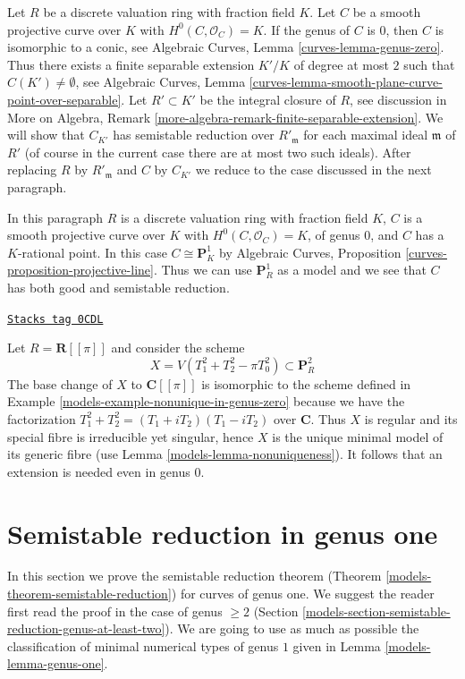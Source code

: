 \medskip\noindent
Let $R$ be a discrete valuation ring with fraction field $K$.
Let $C$ be a smooth projective curve over $K$ with $H^0(C, \mathcal{O}_C) = K$.
If the genus of $C$ is $0$, then $C$ is isomorphic to a conic,
see Algebraic Curves, Lemma \ref{curves-lemma-genus-zero}.
Thus there exists a finite separable extension $K'/K$ of
degree at most $2$ such that $C(K') \not = \emptyset$, see
Algebraic Curves, Lemma
\ref{curves-lemma-smooth-plane-curve-point-over-separable}.
Let $R' \subset K'$ be the integral closure of $R$, see
discussion in More on Algebra, Remark
\ref{more-algebra-remark-finite-separable-extension}.
We will show that $C_{K'}$ has semistable reduction
over $R'_{\mathfrak m}$ for each maximal ideal $\mathfrak m$ of $R'$
(of course in the current case there are at most two such ideals).
After replacing $R$ by $R'_{\mathfrak m}$ and $C$ by $C_{K'}$
we reduce to the case discussed in the next paragraph.

\medskip\noindent
In this paragraph $R$ is a discrete valuation ring with fraction field $K$,
$C$ is a smooth projective curve over $K$ with $H^0(C, \mathcal{O}_C) = K$,
of genus $0$, and $C$ has a $K$-rational point. In this case
$C \cong \mathbf{P}^1_K$ by
Algebraic Curves, Proposition \ref{curves-proposition-projective-line}.
Thus we can use $\mathbf{P}^1_R$ as a model and we see that
$C$ has both good and semistable reduction.

\begin{example}
\label{models-example-extension-necessary-genus-zero}
\href{https://stacks.math.columbia.edu/tag/0CDL}{\texttt{Stacks tag 0CDL}}

Let $R = \mathbf{R}[[\pi]]$ and consider the scheme
$$
X = V(T_1^2 + T_2^2 - \pi T_0^2) \subset \mathbf{P}^2_R
$$
The base change of $X$ to $\mathbf{C}[[\pi]]$ is isomorphic
to the scheme defined in Example \ref{models-example-nonunique-in-genus-zero}
because we have the factorization $T_1^2 + T_2^2 = (T_1 + iT_2)(T_1 - iT_2)$
over $\mathbf{C}$.
Thus $X$ is regular and its special fibre is irreducible yet singular,
hence $X$ is the unique minimal model of its generic fibre
(use Lemma \ref{models-lemma-nonuniqueness}).
It follows that an extension is needed even in genus $0$.
\end{example}

\section{Semistable reduction in genus one}
\label{models-section-semistable-reduction-genus-one}
In this section we prove the semistable reduction theorem
(Theorem \ref{models-theorem-semistable-reduction}) for curves of genus one.
We suggest the reader first read the proof in the case of genus $\geq 2$
(Section \ref{models-section-semistable-reduction-genus-at-least-two}).
We are going to use as much as possible the classification of
minimal numerical types of genus $1$ given in
Lemma \ref{models-lemma-genus-one}.

